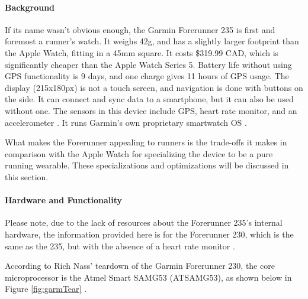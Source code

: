 \paragraph{Background}
If its name wasn't obvious enough, the Garmin Forerunner 235 is first and foremost a runner's
watch. It weighs 42g, and has a slightly larger footprint than the Apple Watch, fitting in a 45mm square.
It costs \$319.99 CAD, which is significantly cheaper than the Apple Watch Series 5. Battery life
without using GPS functionality is 9 days, and one charge gives 11 hours of GPS usage. The display (215x180px)
is not a touch screen, and navigation is done with buttons on the side. It can connect and 
sync data to a smartphone, but it can also be used without one. The sensors 
in this device include GPS, heart rate monitor, and an accelerometer \cite{garmin_price}. 
It runs Garmin's own proprietary smartwatch OS \cite{garmin_specs}.

What makes the Forerunner appealing to runners is the trade-offs it makes in comparison with the Apple Watch
for specializing the device to be a pure running wearable. These specializations and optimizations will
be discussed in this section.

\paragraph{Hardware and Functionality}
Please note, due to the lack of resources about the Forerunner 235's internal hardware,
the information provided here is for the Forerunner 230, which is the same as the 235,
but with the absence of a heart rate monitor \cite{forerunner230235}.

According to Rich Nass' teardown of the Garmin Forerunner 230, the core microprocessor
is the Atmel Smart SAMG53 (ATSAMG53), as shown below in Figure \ref{fig:garmTear} \cite{forerunner_teardown}.

